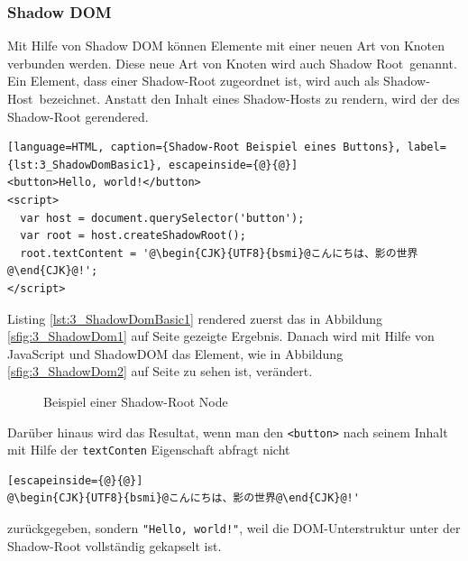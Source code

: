 \subsubsection{Shadow DOM}
\label{sec:3_WC_Shadow_DOM}

Mit Hilfe von Shadow DOM können Elemente mit einer neuen Art von Knoten verbunden werden. Diese neue Art von Knoten wird auch \glqq Shadow Root\grqq\ genannt. Ein Element, dass einer Shadow-Root zugeordnet ist, wird auch als \glqq Shadow-Host\grqq\ bezeichnet. Anstatt den Inhalt eines Shadow-Hosts zu rendern, wird der des Shadow-Root gerendered.

\begin{lstlisting}[language=HTML, caption={Shadow-Root Beispiel eines Buttons}, label={lst:3_ShadowDomBasic1}, escapeinside={@}{@}]
<button>Hello, world!</button>
<script>
  var host = document.querySelector('button');
  var root = host.createShadowRoot();
  root.textContent = '@\begin{CJK}{UTF8}{bsmi}@こんにちは、影の世界@\end{CJK}@!';
</script>
\end{lstlisting}

Listing \ref{lst:3_ShadowDomBasic1} rendered zuerst das in Abbildung \ref{sfig:3_ShadowDom1} auf Seite \pageref{sfig:3_ShadowDom1} gezeigte Ergebnis. Danach wird mit Hilfe von JavaScript und ShadowDOM das Element, wie in Abbildung \ref{sfig:3_ShadowDom2} auf Seite \pageref{sfig:3_ShadowDom2} zu sehen ist, verändert.

\begin{figure}[h]
  \centering
  \qquad
  \caption[
    Beispiel einer Shadow-Root Node
  ]{
    Beispiel einer Shadow-Root Node
  }
  \label{sfig:3_ShadowDom}
\end{figure}

Darüber hinaus wird das Resultat, wenn man den \lstinline|<button>| nach seinem Inhalt mit Hilfe der \lstinline|textConten| Eigenschaft abfragt nicht
\begin{lstlisting}[escapeinside={@}{@}]
@\begin{CJK}{UTF8}{bsmi}@こんにちは、影の世界@\end{CJK}@!'
\end{lstlisting}
zurückgegeben, sondern \lstinline|"Hello, world!"|, weil die DOM-Unterstruktur unter der Shadow-Root vollständig gekapselt ist.


